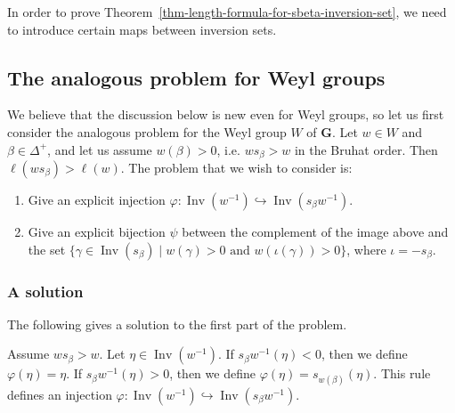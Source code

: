 \documentclass[ALCO,ThmDefs,Unicode]{cedram}
\DeclareMathOperator{\Inv}{Inv}
\newcommand{\bG}{\mathbf{G}}
\newcommand{\suchthat}{\mid}
\newcommand{\textand}{\text{ and }}
\begin{document}
In order to prove Theorem~\ref{thm-length-formula-for-sbeta-inversion-set}, we need to introduce certain maps between inversion sets.

\subsection{The analogous problem for Weyl groups}

We believe that the discussion below is new even for Weyl groups, so let us first consider the analogous problem for the Weyl group $W$ of $\bG$. Let $w \in W$ and $\beta\in\Delta^+$, and let us assume $w(\beta) > 0$, i.e. $w s_\beta > w$ in the Bruhat order. Then $\ell(ws_\beta) > \ell(w)$. The problem that we wish to consider is:
\begin{enumerate}
\item Give an explicit injection $\varphi:\Inv(w^{-1}) \hookrightarrow \Inv(s_\beta w^{-1})$.
\item Give an explicit bijection $\psi$ between the complement of the image above and the set $\{\gamma \in \Inv(s_\beta) \suchthat w(\gamma) > 0 \textand w(\iota(\gamma)) > 0 \}$, where $\iota = -s_\beta$.
\end{enumerate}

\subsubsection{A solution}

The following gives a solution to the first part of the problem.
\begin{prop}\label{prop-phi-is-injection}
Assume $w s_\beta > w$. Let $\eta \in \Inv(w^{-1})$. If $s_\beta w^{-1}(\eta) < 0$, then we define $\varphi(\eta) = \eta$. If $s_\beta w^{-1}(\eta) > 0$, then we define $\varphi(\eta) = s_{w(\beta)}(\eta)$. This rule defines an injection $\varphi: \Inv(w^{-1}) \hookrightarrow \Inv(s_\beta w^{-1})$.
\end{prop}
\end{document}
